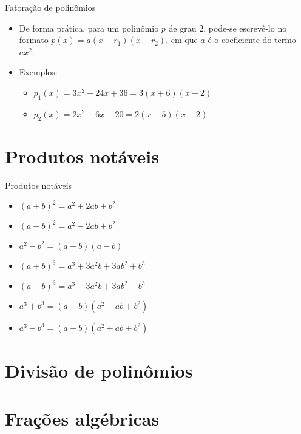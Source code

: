 \documentclass[14pt, aspectratio=169]{beamer}
\newcommand{\skipframe}{\vspace{10.0cm}}
\begin{document}
\begin{frame}[allowframebreaks]{Fatoração de polinômios}
\begin{itemize}
    \skipframe

    \item De forma prática, para um polinômio $p$ de grau 2, pode-se escrevê-lo no formato $p(x) = a(x - r_1)(x - r_2)$, em que $a$ é o coeficiente do termo $ax^2$.

    \item Exemplos:
    \begin{itemize}
        \item $p_1(x) = 3x^2 + 24x + 36 = 3(x + 6)(x + 2)$
        \item $p_2(x) = 2x^2 - 6x - 20 = 2(x - 5)(x + 2)$
    \end{itemize}

\end{itemize}
    
\end{frame}

\section{Produtos notáveis}

\begin{frame}{Produtos notáveis}

\begin{itemize}
    \item $(a + b)^2 = a^2 + 2ab + b^2$
    \item $(a - b)^2 = a^2 - 2ab + b^2$
    \item $a^2 - b^2 = (a + b)(a - b)$
    \item $(a + b)^3 = a^3 + 3a^2b + 3ab^2 + b^3$
    \item $(a - b)^3 = a^3 - 3a^2b + 3ab^2 - b^3$
    \item $a^3 + b^3 = (a + b)(a^2 - ab + b^2)$
    \item $a^3 - b^3 = (a - b)(a^2 + ab + b^2)$
\end{itemize}
    
\end{frame}

\section{Divisão de polinômios}

\section{Frações algébricas}
\end{document}
